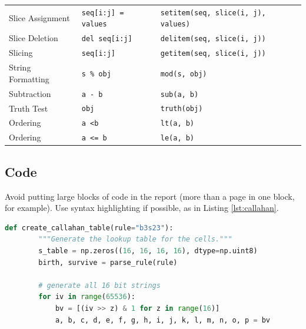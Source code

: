 \documentclass{l4proj}
\begin{document}
{\begin{table}[]
\begin{tabular}{@{}lll@{}}
    Slice Assignment      & \texttt{seq{[}i:j{]} = values}          & \texttt{setitem(seq, slice(i, j), values)}            \\
    Slice Deletion        & \texttt{del seq{[}i:j{]}}               & \texttt{delitem(seq, slice(i, j))}                    \\
    Slicing               & \texttt{seq{[}i:j{]}}                   & \texttt{getitem(seq, slice(i, j))}                    \\
    String Formatting     & \texttt{s \% obj}                       & \texttt{mod(s, obj)}                                  \\
    Subtraction           & \texttt{a - b}                          & \texttt{sub(a, b)}                                    \\
    Truth Test            & \texttt{obj}                            & \texttt{truth(obj)}                                   \\
    Ordering              & \texttt{a \textless b}                  & \texttt{lt(a, b)}                                     \\
    Ordering              & \texttt{a \textless{}= b}               & \texttt{le(a, b)}                                     \\
    \end{tabular}
    \end{table}
\subsection{Code}

Avoid putting large blocks of code in the report (more than a page in one block, for example). Use syntax highlighting if possible, as in Listing \ref{lst:callahan}.

\begin{lstlisting}[language=python, float, caption={The algorithm for packing the $3\times 3$ outer-totalistic binary CA successor rule into a 
    $16\times 16\times 16\times 16$ 4 bit lookup table, running an equivalent, notionally 16-state $2\times 2$ CA.}, label=lst:callahan]
    def create_callahan_table(rule="b3s23"):
        """Generate the lookup table for the cells."""        
        s_table = np.zeros((16, 16, 16, 16), dtype=np.uint8)
        birth, survive = parse_rule(rule)

        # generate all 16 bit strings
        for iv in range(65536):
            bv = [(iv >> z) & 1 for z in range(16)]
            a, b, c, d, e, f, g, h, i, j, k, l, m, n, o, p = bv


\end{lstlisting}}
\end{document}
